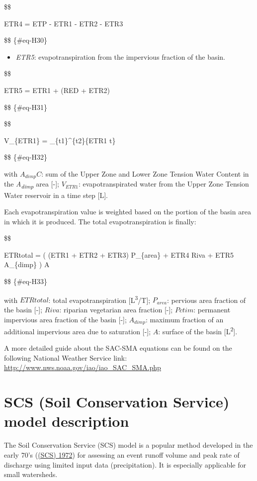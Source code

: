\documentclass[
  letterpaper,
  DIV=11,
  numbers=noendperiod]{scrreprt}
\providecommand{\tightlist}{%
  \setlength{\itemsep}{0pt}\setlength{\parskip}{0pt}}\usepackage{longtable,booktabs,array}
\begin{document}
\$\$

ETR4 = ETP - ETR1 - ETR2 - ETR3

\$\$ \{\#eq-H30\}

\begin{itemize}
\tightlist
\item
  \emph{ETR5}: evapotranspiration from the impervious fraction of the
  basin.
\end{itemize}

\$\$

ETR5 = ETR1 + (RED + ETR2)
\cdot {}

\$\$ \{\#eq-H31\}

\$\$

V\_\{ETR1\} = \int\_\{t1\}\^{}\{t2\}\{ETR1 \cdot {}t\}

\$\$ \{\#eq-H32\}

with \(A_{dimp}C\): sum of the Upper Zone and Lower Zone Tension Water
Content in the \emph{A\textsubscript{dimp}} area {[}-{]}; \(V_{ETR1}\):
evapotranspirated water from the Upper Zone Tension Water reservoir in a
time step {[}L{]}.

Each evapotranspiration value is weighted based on the portion of the
basin area in which it is produced. The total evapotranspiration is
finally:

\$\$

ETRtotal = \Big( (ETR1 + ETR2 + ETR3) \cdot P\_\{area\} + ETR4
\cdot Riva + ETR5 \cdot A\_\{dimp\} \Big) \cdot A

\$\$ \{\#eq-H33\}

with \(ETRtotal\): total evapotranspiration
{[}L\textsuperscript{3}/T{]}; \(P_{area}\): pervious area fraction of
the basin {[}-{]}; \(Riva\): riparian vegetarian area fraction {[}-{]};
\(Pctim\): permanent impervious area fraction of the basin {[}-{]};
\(A_{dimp}\): maximum fraction of an additional impervious area due to
saturation {[}-{]}; \(A\): surface of the basin
{[}L\textsuperscript{2}{]}.

A more detailed guide about the SAC-SMA equations can be found on the
following National Weather Service link:
\url{http://www.nws.noaa.gov/iao/iao_SAC_SMA.php}

\hypertarget{sec-model_scs}{%
\chapter{SCS (Soil Conservation Service) model
description}\label{sec-model_scs}}

The Soil Conservation Service (SCS) model is a popular method developed
in the early 70's
(\protect\hyperlink{ref-soil_conservation_service_scs_national_1972}{(SCS)
1972}) for assessing an event runoff volume and peak rate of discharge
using limited input data (precipitation). It is especially applicable
for small watersheds.
\end{document}
